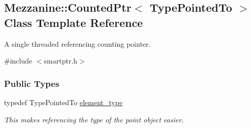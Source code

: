 \hypertarget{classMezzanine_1_1CountedPtr}{
\subsection{Mezzanine::CountedPtr$<$ TypePointedTo $>$ Class Template Reference}
\label{classMezzanine_1_1CountedPtr}
}


A single threaded referencing counting pointer.  




{\ttfamily \#include $<$smartptr.h$>$}

\subsubsection*{Public Types}
\begin{DoxyCompactItemize}
\item 
\hypertarget{classMezzanine_1_1CountedPtr_a3bad88b1ac4c311ca63891bc5689582b}{
typedef TypePointedTo \hyperlink{classMezzanine_1_1CountedPtr_a3bad88b1ac4c311ca63891bc5689582b}{element\_\-type}}
\label{classMezzanine_1_1CountedPtr_a3bad88b1ac4c311ca63891bc5689582b}

\begin{DoxyCompactList}\small\item\em This makes referencing the type of the point object easier. \item\end{DoxyCompactList}\end{DoxyCompactItemize}
